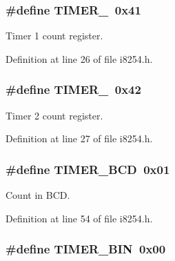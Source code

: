 \subsubsection[{T\+I\+M\+E\+R\+\_\+1}]{\setlength{\rightskip}{0pt plus 5cm}\#define T\+I\+M\+E\+R\+\_~0x41}\label{group__i8254_gac62c99c2a9289891c1b83052242cca49}


Timer 1 count register. 



Definition at line 26 of file i8254.\+h.

\hypertarget{group__i8254_ga1f34f18ad0ab8cace46b615773b48735}{}
\subsubsection[{T\+I\+M\+E\+R\+\_\+2}]{\setlength{\rightskip}{0pt plus 5cm}\#define T\+I\+M\+E\+R\+\_~0x42}\label{group__i8254_ga1f34f18ad0ab8cace46b615773b48735}


Timer 2 count register. 



Definition at line 27 of file i8254.\+h.

\hypertarget{group__i8254_ga325b992a371d5d981c4eceff42fa5956}{}
\subsubsection[{T\+I\+M\+E\+R\+\_\+\+B\+C\+D}]{\setlength{\rightskip}{0pt plus 5cm}\#define T\+I\+M\+E\+R\+\_\+\+B\+C\+D~0x01}\label{group__i8254_ga325b992a371d5d981c4eceff42fa5956}


Count in B\+C\+D. 



Definition at line 54 of file i8254.\+h.

\hypertarget{group__i8254_gad2913dcf2f91453317bd035589ac0a7d}{}
\subsubsection[{T\+I\+M\+E\+R\+\_\+\+B\+I\+N}]{\setlength{\rightskip}{0pt plus 5cm}\#define T\+I\+M\+E\+R\+\_\+\+B\+I\+N~0x00}\label{group__i8254_gad2913dcf2f91453317bd035589ac0a7d}


